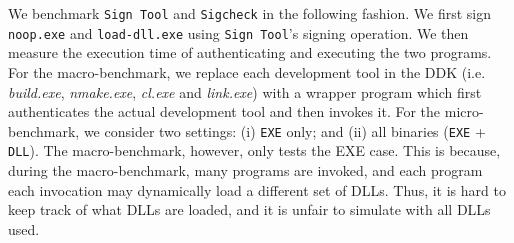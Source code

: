 We benchmark {\tt Sign Tool} and {\tt Sigcheck} in the following fashion.
We first sign {\tt noop.exe} and {\tt load-dll.exe} using 
{\tt Sign Tool}'s signing operation.
We then measure the execution time of 
authenticating and executing the two programs.
For the macro-benchmark, we replace each development tool in the DDK
(i.e. {\it build.exe}, {\it nmake.exe}, {\it cl.exe} and {\it link.exe})
with a wrapper program which first authenticates the actual development 
tool and then invokes it.
For the micro-benchmark, we consider two settings: 
(i) {\tt EXE} only; and (ii) all binaries ({\tt EXE} + {\tt DLL}).
The macro-benchmark, however, only tests the EXE case.
This is because, during the macro-benchmark, many programs are invoked,
and each program each invocation may dynamically load a different set of DLLs.
Thus, it is hard to keep track of what DLLs are loaded, and it is
unfair to simulate with all DLLs used.

